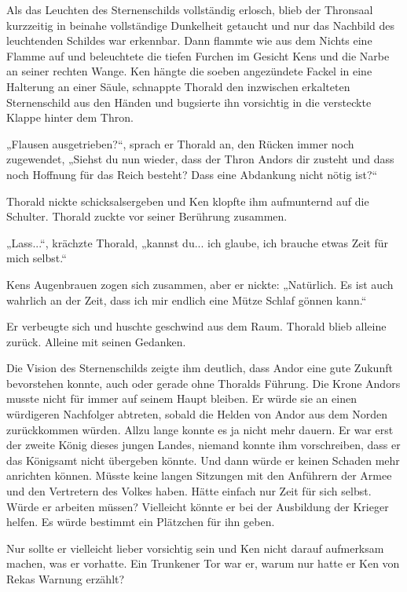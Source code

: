 \documentclass[10pt, a4paper, oneside]{book}
\begin{document}
Als das Leuchten des Sternenschilds vollständig erlosch, blieb der Thronsaal kurzzeitig in beinahe vollständige Dunkelheit getaucht und nur das Nachbild des leuchtenden Schildes war erkennbar. Dann flammte wie aus dem Nichts eine Flamme auf und beleuchtete die tiefen Furchen im Gesicht Kens und die Narbe an seiner rechten Wange. Ken hängte die soeben angezündete Fackel in eine Halterung an einer Säule, schnappte Thorald den inzwischen erkalteten Sternenschild aus den Händen und bugsierte ihn vorsichtig in die versteckte Klappe hinter dem Thron.

„Flausen ausgetrieben?“, sprach er Thorald an, den Rücken immer noch zugewendet, „Siehst du nun wieder, dass der Thron Andors dir zusteht und dass noch Hoffnung für das Reich besteht? Dass eine Abdankung nicht nötig ist?“

Thorald nickte schicksalsergeben und Ken klopfte ihm aufmunternd auf die Schulter. Thorald zuckte vor seiner Berührung zusammen.

„Lass...“, krächzte Thorald, „kannst du... ich glaube, ich brauche etwas Zeit für mich selbst.“

Kens Augenbrauen zogen sich zusammen, aber er nickte: „Natürlich. Es ist auch wahrlich an der Zeit, dass ich mir endlich eine Mütze Schlaf gönnen kann.“

Er verbeugte sich und huschte geschwind aus dem Raum. Thorald blieb alleine zurück. Alleine mit seinen Gedanken.

Die Vision des Sternenschilds zeigte ihm deutlich, dass Andor eine gute Zukunft bevorstehen konnte, auch oder gerade ohne Thoralds Führung. Die Krone Andors musste nicht für immer auf seinem Haupt bleiben. Er würde sie an einen würdigeren Nachfolger abtreten, sobald die Helden von Andor aus dem Norden zurückkommen würden. Allzu lange konnte es ja nicht mehr dauern. Er war erst der zweite König dieses jungen Landes, niemand konnte ihm vorschreiben, dass er das Königsamt nicht übergeben könnte. Und dann würde er keinen Schaden mehr anrichten können. Müsste keine langen Sitzungen mit den Anführern der Armee und den Vertretern des Volkes haben. Hätte einfach nur Zeit für sich selbst. Würde er arbeiten müssen? Vielleicht könnte er bei der Ausbildung der Krieger helfen. Es würde bestimmt ein Plätzchen für ihn geben.

Nur sollte er vielleicht lieber vorsichtig sein und Ken nicht darauf aufmerksam machen, was er vorhatte. Ein Trunkener Tor war er, warum nur hatte er Ken von Rekas Warnung erzählt?
\end{document}
